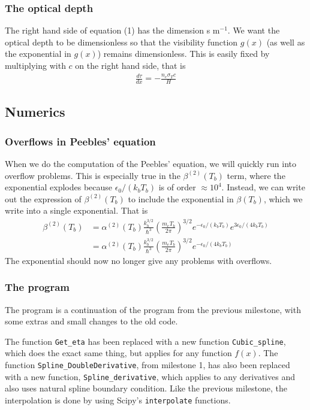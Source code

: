 \documentclass[12pt]{article}
\begin{document}
\subsubsection*{The optical depth}
The right hand side of equation (1) has the dimension s m$^{-1}$. We want the optical depth to be dimensionless so that the visibility function $g(x)$ (as well as the exponential in  $g(x)$) remains dimensionless. This is easily fixed by multiplying with $c$ on the right hand side, that is
\begin{align}
\frac{d\tau}{dx} = -\frac{n_e \sigma_T c}{H}
\end{align}
\subsection*{Numerics}
\subsubsection*{Overflows in Peebles' equation}
When we do the computation of the Peebles' equation, we will quickly run into overflow problems. This is especially true in the $\beta^{(2)}(T_b)$ term, where the exponential explodes because $\epsilon_0/(k_bT_b)$ is of order $\approx 10^4$. Instead, we can write out the expression of $\beta^{(2)}(T_b)$ to include the exponential in $\beta(T_b)$, which we write into a single exponential. That is
\begin{align}
\beta^{(2)}(T_b) &= \alpha^{(2)}(T_b)\frac{k_b^{3/2}}{\hbar^3}\left(\frac{m_e T_b}{2\pi}\right)^{3/2}e^{-\epsilon_0/(k_bT_b)}e^{3\epsilon_0/(4k_bT_b)} \nonumber \\
&= \alpha^{(2)}(T_b)\frac{k_b^{3/2}}{\hbar^3}\left(\frac{m_e T_b}{2\pi}\right)^{3/2}e^{-\epsilon_0/(4k_bT_b)}
\end{align}
The exponential should now no longer give any problems with overflows.
\subsubsection*{The program}
The program is a continuation of the program from the previous milestone, with some extras and small changes to the old code. 

The function \verb|Get_eta| has been replaced with a new function \verb|Cubic_spline|, which does the exact same thing, but applies for any function $f(x)$. The function \verb|Spline_DoubleDerivative|, from milestone 1, has also been replaced with a new function, \verb|Spline_derivative|, which applies to any derivatives and also uses natural spline boundary condition. Like the previous milestone, the interpolation is done by using Scipy's \verb|interpolate| functions.
\end{document}
